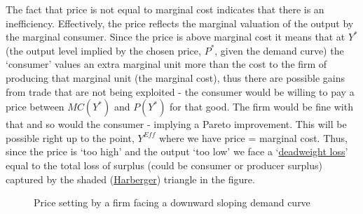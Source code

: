 \documentclass[authoryear,11pt]{elsarticle}
\begin{document}
The fact that price is not equal to marginal cost indicates that there is an inefficiency. Effectively, the price reflects the marginal valuation of the output by the marginal consumer. Since the price is above marginal cost it means that at $Y^{\ast}$ (the output level implied by the chosen price, $P^{\ast}$, given the demand curve) the `consumer' values an extra marginal unit more than the cost to the firm of producing that marginal unit (the marginal cost), thus there are possible gains from trade that are not being exploited - the consumer would be willing to pay a price between $MC(Y^{\ast})$ and $P(Y^{\ast})$ for that good. The firm would be fine with that and so would the consumer - implying a Pareto improvement. This will be possible right up to the point, $Y^{Eff}$ where we have price = marginal cost. Thus, since the price is `too high' and the output `too low' we face a `\href{https://en.wikipedia.org/wiki/Deadweight_loss}{deadweight loss}' equal to the total loss of surplus (could be consumer or producer surplus) captured by the shaded (\href{https://market.subwiki.org/wiki/Harberger's_triangle}{Harberger}) triangle in the figure.

\begin{figure}[!htb]
\caption{\label{fig:monop_comp} Price setting by a firm facing a downward sloping demand curve}
\end{figure}
\end{document}
